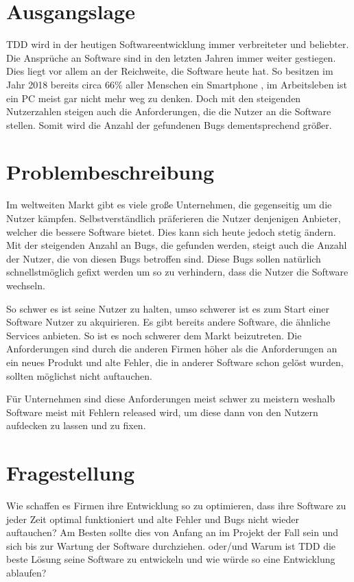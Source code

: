 \section{Ausgangslage}
TDD wird in der heutigen Softwareentwicklung immer verbreiteter und beliebter.
Die Ansprüche an Software sind in den letzten Jahren immer weiter gestiegen. Dies
liegt vor allem an der Reichweite, die Software heute hat. So besitzen im Jahr
2018 bereits circa 66\% aller Menschen ein Smartphone \cite{FraukeSchobelt:Smartphone},
im Arbeitsleben ist ein PC meist gar nicht mehr weg zu denken. Doch mit den steigenden
Nutzerzahlen steigen auch die Anforderungen, die die Nutzer an die Software stellen.
Somit wird die Anzahl der gefundenen Bugs dementsprechend größer.

\section{Problembeschreibung}
Im weltweiten Markt gibt es viele große Unternehmen, die gegenseitig um die
Nutzer kämpfen. Selbstverständlich präferieren die Nutzer denjenigen Anbieter, welcher die bessere
Software bietet. Dies kann sich heute jedoch stetig ändern. Mit der steigenden Anzahl
an Bugs, die gefunden werden, steigt auch die Anzahl der Nutzer, die von diesen Bugs betroffen
sind. Diese Bugs sollen natürlich schnellstmöglich gefixt werden um so zu verhindern,
dass die Nutzer die Software wechseln.

So schwer es ist seine Nutzer zu halten, umso schwerer ist es zum Start einer Software
Nutzer zu akquirieren. Es gibt bereits andere Software, die ähnliche Services anbieten.
So ist es noch schwerer dem Markt beizutreten. Die Anforderungen sind durch die
anderen Firmen höher als die Anforderungen an ein neues Produkt und alte Fehler, die
in anderer Software schon gelöst wurden, sollten möglichst nicht auftauchen.

Für Unternehmen sind diese Anforderungen meist schwer zu meistern weshalb Software
meist mit Fehlern released wird, um diese dann von den Nutzern aufdecken zu lassen und
zu fixen.

\section{Fragestellung}
Wie schaffen es Firmen ihre Entwicklung so zu optimieren, dass ihre Software zu jeder
Zeit optimal funktioniert und alte Fehler und Bugs nicht wieder auftauchen? Am Besten
sollte dies von Anfang an im Projekt der Fall sein und sich bis zur Wartung der Software
durchziehen.
\newline
oder/und
\newline
Warum ist TDD die beste Lösung seine Software zu entwickeln und wie würde so eine
Entwicklung ablaufen?


